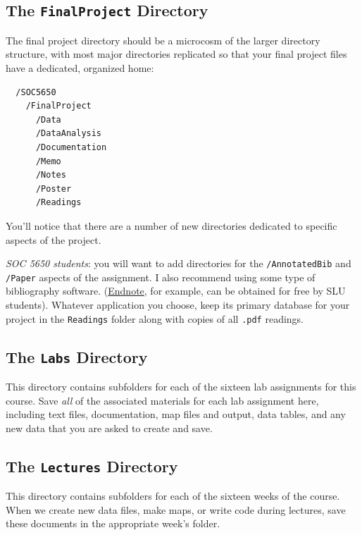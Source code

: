 \documentclass[]{book}
\theoremstyle{definition}
\theoremstyle{definition}
\theoremstyle{definition}
\theoremstyle{remark}
\begin{document}
\subsection{\texorpdfstring{The \texttt{FinalProject}
Directory}{The FinalProject Directory}}\label{the-finalproject-directory}

The final project directory should be a microcosm of the larger
directory structure, with most major directories replicated so that your
final project files have a dedicated, organized home:

\begin{verbatim}
  /SOC5650
    /FinalProject
      /Data
      /DataAnalysis
      /Documentation
      /Memo
      /Notes
      /Poster
      /Readings
\end{verbatim}

You'll notice that there are a number of new directories dedicated to
specific aspects of the project.

\emph{SOC 5650 students}: you will want to add directories for the
\texttt{/AnnotatedBib} and \texttt{/Paper} aspects of the assignment. I
also recommend using some type of bibliography software.
(\href{http://endnote.com}{Endnote}, for example, can be obtained for
free by SLU students). Whatever application you choose, keep its primary
database for your project in the \texttt{Readings} folder along with
copies of all \texttt{.pdf} readings.

\subsection{\texorpdfstring{The \texttt{Labs}
Directory}{The Labs Directory}}\label{the-labs-directory}

This directory contains subfolders for each of the sixteen lab
assignments for this course. Save \emph{all} of the associated materials
for each lab assignment here, including text files, documentation, map
files and output, data tables, and any new data that you are asked to
create and save.

\subsection{\texorpdfstring{The \texttt{Lectures}
Directory}{The Lectures Directory}}\label{the-lectures-directory}

This directory contains subfolders for each of the sixteen weeks of the
course. When we create new data files, make maps, or write code during
lectures, save these documents in the appropriate week's folder.
\end{document}
